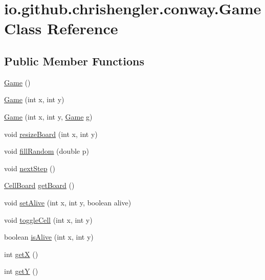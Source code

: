 \hypertarget{classio_1_1github_1_1chrishengler_1_1conway_1_1_game}{}\section{io.\+github.\+chrishengler.\+conway.\+Game Class Reference}
\label{classio_1_1github_1_1chrishengler_1_1conway_1_1_game}
\subsection*{Public Member Functions}
\begin{DoxyCompactItemize}
\item 
\hyperlink{classio_1_1github_1_1chrishengler_1_1conway_1_1_game_ad1fc4a4831375c08da54f3ed5ea86497}{Game} ()
\item 
\hyperlink{classio_1_1github_1_1chrishengler_1_1conway_1_1_game_a3cac815fa6b8c5e753accc9930068801}{Game} (int x, int y)
\item 
\hyperlink{classio_1_1github_1_1chrishengler_1_1conway_1_1_game_af99bec40d23e8207f974933989721740}{Game} (int x, int y, \hyperlink{classio_1_1github_1_1chrishengler_1_1conway_1_1_game}{Game} g)
\item 
void \hyperlink{classio_1_1github_1_1chrishengler_1_1conway_1_1_game_aa906c1d00d7dd8bf267ba10206d3465e}{resize\+Board} (int x, int y)
\item 
void \hyperlink{classio_1_1github_1_1chrishengler_1_1conway_1_1_game_aa6b4e9095b28f2f9fe10410089b7570b}{fill\+Random} (double p)
\item 
void \hyperlink{classio_1_1github_1_1chrishengler_1_1conway_1_1_game_ad82729652ed2d593324db51b0f6d49e7}{next\+Step} ()
\item 
\hyperlink{classio_1_1github_1_1chrishengler_1_1conway_1_1_cell_board}{Cell\+Board} \hyperlink{classio_1_1github_1_1chrishengler_1_1conway_1_1_game_a4ff5851c957ee998017f7f0911228a16}{get\+Board} ()
\item 
void \hyperlink{classio_1_1github_1_1chrishengler_1_1conway_1_1_game_a97e618d6f05f708c09b3f1c0c1b98c43}{set\+Alive} (int x, int y, boolean alive)
\item 
void \hyperlink{classio_1_1github_1_1chrishengler_1_1conway_1_1_game_aeb5f11f00e46a6471e813c7e2f951291}{toggle\+Cell} (int x, int y)
\item 
boolean \hyperlink{classio_1_1github_1_1chrishengler_1_1conway_1_1_game_ab26b20a57e7c46e105d9a881fa53cc31}{is\+Alive} (int x, int y)
\item 
int \hyperlink{classio_1_1github_1_1chrishengler_1_1conway_1_1_game_a7b6afc4b174fd150ddd9a053cfebc121}{getX} ()
\item 
int \hyperlink{classio_1_1github_1_1chrishengler_1_1conway_1_1_game_a43296dab4be1ce47cf2e1dffda221734}{getY} ()
\end{DoxyCompactItemize}



